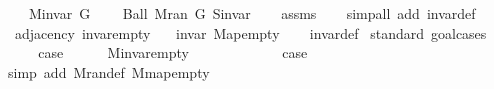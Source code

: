 \begin{isabellebody}
\ \ \ \ {\isachardoublequoteopen}M{\isachardot}{\kern0pt}invar\ G{\isachardoublequoteclose}\isanewline
\ \ \ \ {\isachardoublequoteopen}Ball\ {\isacharparenleft}{\kern0pt}M{\isachardot}{\kern0pt}ran\ G{\isacharparenright}{\kern0pt}\ S{\isachardot}{\kern0pt}invar{\isachardoublequoteclose}%
\endisataginvisible
{\isafoldinvisible}%
%
\isadeliminvisible
\isanewline
%
\endisadeliminvisible
%
\isadelimproof
\ \ %
\endisadelimproof
%
\isatagproof
{}\isamarkupfalse%
\ assms\isanewline
\ \ \isamarkupfalse%
\ {\isacharparenleft}{\kern0pt}simp{\isacharunderscore}{\kern0pt}all\ add{\isacharcolon}{\kern0pt}\ invar{\isacharunderscore}{\kern0pt}def{\isacharparenright}{\kern0pt}%
\endisatagproof
{\isafoldproof}%
%
\isadelimproof
\isanewline
%
\endisadelimproof
%
\isadeliminvisible
\isanewline
%
\endisadeliminvisible
%
\isataginvisible
{}\isamarkupfalse%
\ {\isacharparenleft}{\kern0pt}\ adjacency{\isacharparenright}{\kern0pt}\ invar{\isacharunderscore}{\kern0pt}empty{\isacharcolon}{\kern0pt}\isanewline
\ \ \ {\isachardoublequoteopen}invar\ Map{\isacharunderscore}{\kern0pt}empty{\isachardoublequoteclose}%
\endisataginvisible
{\isafoldinvisible}%
%
\isadeliminvisible
\isanewline
%
\endisadeliminvisible
%
\isadelimproof
\ \ %
\endisadelimproof
%
\isatagproof
{}\isamarkupfalse%
\ invar{\isacharunderscore}{\kern0pt}def\isanewline
{}\isamarkupfalse%
\ {\isacharparenleft}{\kern0pt}standard{\isacharcomma}{\kern0pt}\ goal{\isacharunderscore}{\kern0pt}cases{\isacharparenright}{\kern0pt}\isanewline
\ \ \isamarkupfalse%
\ {}\isanewline
\ \ \isamarkupfalse%
\ {\isacharquery}{\kern0pt}case\isanewline
\ \ \ \ \isamarkupfalse%
\ M{\isachardot}{\kern0pt}invar{\isacharunderscore}{\kern0pt}empty\isanewline
\ \ \ \ \isacommand{{\isachardot}{\kern0pt}}\isamarkupfalse%
\isanewline
{}\isamarkupfalse%
\isanewline
\ \ \isamarkupfalse%
\ {}\isanewline
\ \ \isamarkupfalse%
\ {\isacharquery}{\kern0pt}case\isanewline
\ \ \ \ \isamarkupfalse%
\ {\isacharparenleft}{\kern0pt}simp\ add{\isacharcolon}{\kern0pt}\ M{\isachardot}{\kern0pt}ran{\isacharunderscore}{\kern0pt}def\ M{\isachardot}{\kern0pt}map{\isacharunderscore}{\kern0pt}empty{\isacharparenright}{\kern0pt}\isanewline
{}\isamarkupfalse%
%
\endisatagproof
{\isafoldproof}%
%
\isadelimproof
\isanewline
%
\endisadelimproof
%
\isadeliminvisible
\isanewline
%
\endisadeliminvisible
%
\isataginvisible

\end{isabellebody}
